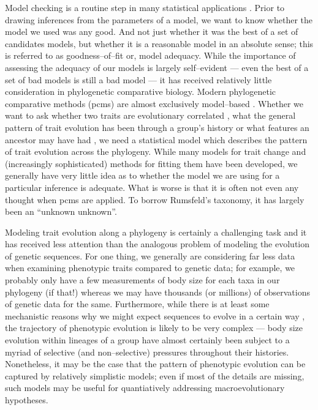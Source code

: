 \documentclass[a4paper,12pt]{article}
\begin{document}
\noindent Model checking is a routine step in many statistical applications \citep[e.g.][ch. 6]{Gelmanbook}. Prior to drawing inferences from the parameters of a model, we want to know whether the model we used was any good. And not just whether it was the best of a set of candidates models, but whether it is a reasonable model in an absolute sense; this is referred to as goodness--of--fit or, model adequacy. While the importance of assessing the adequacy of our models is largely self--evident --- even the best of a set of bad models is still a bad model --- it has received relatively little consideration in phylogenetic comparative biology. Modern phylogenetic comparative methods (pcms) are almost exclusively model--based \citep[recently reviewed in][]{Omeara2012, PennellHarmon}. Whether we want to ask whether two traits are evolutionary correlated \citep[e.g.][]{Felsenstein1985, Grafen1989, HarveyPagel1991}, what the general pattern of trait evolution has been through a group's history \citep[e.g.][]{Mooers1999, Harmon2010, Hunt2012} or what features an ancestor may have had \citep[e.g.][]{Schluter1997, Huelsenbeck2003}, we need a statistical model which describes the pattern of trait evolution across the phylogeny. While many models for trait change and (increasingly sophisticated) methods for fitting them have been developed, we generally have very little idea as to whether the model we are using for a particular inference is adequate. What is worse is that it is often not even any thought when pcms are applied. To borrow Rumsfeld's taxonomy, it has largely been an ``unknown unknown''.

Modeling trait evolution along a phylogeny is certainly a challenging task and it has received less attention than the analogous problem of modeling the evolution of genetic sequences. For one thing, we generally are considering far less data when examining phenotypic traits compared to genetic data; for example, we probably only have a few  measurements of body size for each taxa in our phylogeny (if that!) whereas we may have thousands (or millions) of observations of genetic data for the same. Furthermore, while there is at least some mechanistic reasons why we might expect sequences to evolve in a certain way \citep{Kimura1983, Wakeley2008}, the trajectory of phenotypic evolution is likely to be very complex --- body size evolution within lineages of a group have almost certainly been subject to a myriad of selective (and non--selective) pressures throughout their histories. Nonetheless, it may be the case that the pattern of phenotypic evolution can be captured by relatively simplistic models; even if most of the details are missing, such models may be useful for quantiatively addressing macroevolutionary hypotheses. 
\end{document}
